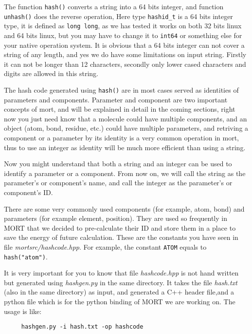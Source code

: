 \documentclass[letterpaper]{book}
\begin{document}
  The function \lstinline$hash()$ converts a string into a 64 bits integer, and function \lstinline$unhash()$
does the reverse operation, Here type \lstinline$hashid_t$ is a 64 bits integer type, it is defined as 
\lstinline$long long$, as we has tested it works on both 32 bits linux and 64 bits linux, but you may have to
change it to \lstinline$int64$ or something else for your native operation system.
It is obvious that a 64 bits integer can not cover a string of any length, and yes we do have some limitations
on input string. Firstly it can not be longer than 12 characters, secondly only lower cased characters and digits 
are allowed in this string.

  The hash code generated using \lstinline$hash()$ are in most cases served as identities of parameters and components. 
Parameter and component are two important concepts of mort, and will be explained in detail in the coming sections, 
right now you just need know that a molecule could have multiple components, and an object (atom, bond, residue, etc.) 
could have multiple parameters, and retriving a component or a parameter by its identity is a very common operation 
in mort, thus to use an integer as identity will be much more efficient than using a string. 

  Now you might understand that both a string and an integer can be used to identify a parameter or a component. From
now on, we will call the string as the parameter's or component's name, and call the integer as the parameter's or 
component's ID.

  There are some very commonly used components (for example, atom, bond) and parameters (for example element, position).
They are used so frequently in MORT that we decided to pre-calculate their ID and store them in a place to save the energy
of future calculation. These are the constants you have seen in file {\it mortsrc/hashcode.hpp}. For example, the constant
\lstinline$ATOM$ equals to \lstinline$hash("atom")$. 

  It is very important for you to know that file {\it hashcode.hpp} is not hand written but generated using 
{\it hashgen.py} in the same directory. It takes the file {\it hash.txt} (also in the same directory) as input, 
and generated a C++ header file,and a python file which is for the python binding of MORT we are working on. 
The usage is like:

\begin{lstlisting}
     hashgen.py -i hash.txt -op hashcode
\end{lstlisting}
\end{document}
